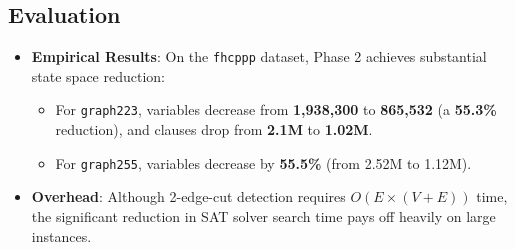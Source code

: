 \subsection{Evaluation}
\begin{itemize}
    \item \textbf{Empirical Results}: On the \texttt{fhcppp} dataset, Phase 2 achieves substantial state space reduction:
    \begin{itemize}
        \item For \texttt{graph223}, variables decrease from \textbf{1,938,300} to \textbf{865,532} (a \textbf{55.3\%} reduction), and clauses drop from \textbf{2.1M} to \textbf{1.02M}.
        \item For \texttt{graph255}, variables decrease by \textbf{55.5\%} (from 2.52M to 1.12M).
    \end{itemize}
    \item \textbf{Overhead}: Although 2-edge-cut detection requires $O(E \times (V+E))$ time, the significant reduction in SAT solver search time pays off heavily on large instances.
\end{itemize}
